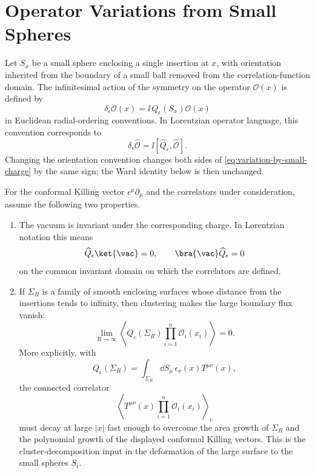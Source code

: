 \section{Operator Variations from Small Spheres}

\begin{definition}
\label{def:small-surface-action-local-operator}
Let \(S_x\) be a small sphere enclosing a single insertion at \(x\), with
orientation inherited from the boundary of a small ball removed from the
correlation-function domain.  The infinitesimal action of the symmetry on the
operator \(\mathcal O(x)\) is defined by
\begin{equation}
  \delta_\epsilon\mathcal O(x)
  =
  \ii\,Q_\epsilon(S_x)\mathcal O(x)
  \label{eq:variation-by-small-charge}
\end{equation}
in Euclidean radial-ordering conventions.  In Lorentzian operator language,
this convention corresponds to
\[
  \delta_\epsilon\widehat{\mathcal O}
  =
  \ii[\widehat Q_\epsilon,\widehat{\mathcal O}].
\]
Changing the orientation convention changes both sides of
\eqref{eq:variation-by-small-charge} by the same sign; the Ward identity
below is then unchanged.
\end{definition}

\begin{hypothesis}
\label{hyp:conformal-charge-vacuum-boundary}
For the conformal Killing vector \(\epsilon^\mu\partial_\mu\) and the
correlators under consideration, assume the following two properties.
\begin{enumerate}[label=(\roman*)]
  \item The vacuum is invariant under the corresponding charge.  In Lorentzian
  notation this means
  \[
    \widehat Q_\epsilon\ket{\vac}=0,
    \qquad
    \bra{\vac}\widehat Q_\epsilon=0
  \]
  on the common invariant domain on which the correlators are defined.
  \item If \(\Sigma_R\) is a family of smooth enclosing surfaces whose distance
  from the insertions tends to infinity, then clustering makes the large
  boundary flux vanish:
  \[
    \lim_{R\to\infty}
    \left\langle
      Q_\epsilon(\Sigma_R)
      \prod_{i=1}^n\mathcal O_i(x_i)
    \right\rangle
    =
    0 .
  \]
  More explicitly, with
  \[
    Q_\epsilon(\Sigma_R)
    =
    \int_{\Sigma_R}\dd S_\mu\,
    \epsilon_\nu(x)T^{\mu\nu}(x),
  \]
  the connected correlator
  \[
    \left\langle
      T^{\mu\nu}(x)\prod_{i=1}^n\mathcal O_i(x_i)
    \right\rangle_{\!c}
  \]
  must decay at large \(|x|\) fast enough to overcome the area growth of
  \(\Sigma_R\) and the polynomial growth of the displayed conformal Killing
  vectors.  This is the cluster-decomposition input in the deformation of the
  large surface to the small spheres \(S_i\).
\end{enumerate}
\end{hypothesis}

